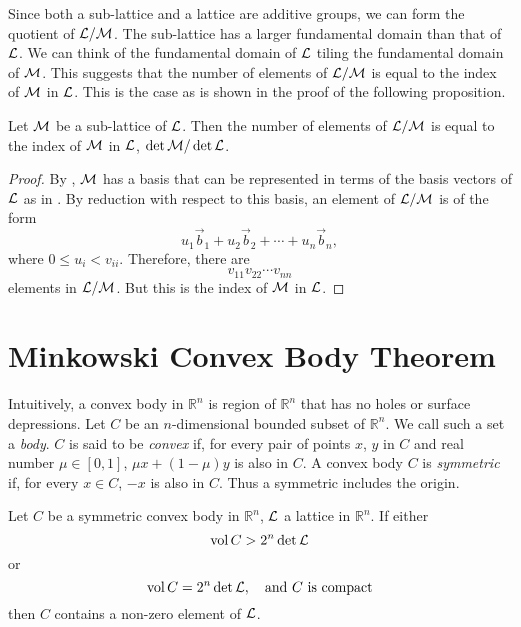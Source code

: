 Since both a sub-lattice and a lattice are additive groups, we can
form the quotient of ${\cal L}/{\cal M}$.  The sub-lattice has a
larger fundamental domain than that of ${\cal L}$.  We can think of
the fundamental domain of ${\cal L}$ tiling the fundamental domain of
${\cal M}$.    This suggests that the number of elements of ${\cal
L}/{\cal M}$ is equal to the index of ${\cal M}$ in ${\cal L}$.  This
is the case as is shown in the proof of the following proposition.

\begin{proposition} \label{SubLattice:Index:Prop}
Let ${\cal M}$ be a sub-lattice of ${\cal L}$.  Then the number of
elements of ${\cal L}/{\cal M}$ is equal to the index of ${\cal M}$ in
${\cal L}$, $\det {\cal M}/\det {\cal L}$.
\end{proposition}

\begin{proof}
By , ${\cal M}$ has a basis that can be
represented in terms of the basis vectors of ${\cal L}$ as in
.  By reduction with respect to this basis,
an element of ${\cal L}/{\cal M}$ is of the form
\[
u_1 \vec{b}_1 + u_2 \vec{b}_2 + \cdots + u_n \vec{b}_n,
\]
where $0 \le u_i < v_{ii}$.  Therefore, there are 
\[
v_{11} v_{22} \cdots v_{nn}
\]
elements in ${\cal L}/{\cal M}$.  But this is the index of ${\cal M}$
in ${\cal L}$.
\end{proof}

\section{Minkowski Convex Body Theorem}

Intuitively, a convex body in $\mathbb{R}^{n}$ is region of $\mathbb{R}^{n}$ that has
no holes or surface depressions.  Let $C$ be an $n$-dimensional
bounded subset of $\mathbb{R}^n$.  We call such a set a {\em body}.  $C$ is
said to be {\em convex} if, for every pair of
points $x$, $y$ in $C$ and real number $\mu \in [0, 1]$, $\mu x + (1 -
\mu) y$ is also in $C$.  A convex body $C$ is {\em
symmetric} if, for every $x \in C$, $-x$
is also in $C$.  Thus a symmetric  includes the origin.

\begin{proposition}[{\Minkowski}]
Let $C$ be a symmetric convex body in $\mathbb{R}^{n}$, ${\cal L}$ a lattice in
$\mathbb{R}^{n}$.  If either
\[
\mathop{\rm vol}\nolimits C > 2^n \det {\cal L}
\]
or 
\[
\mathop{\rm vol}\nolimits C = 2^n \det {\cal L}, \quad \mbox{and $C$ is compact}
\]
then $C$ contains a non-zero element of ${\cal L}$.
\label{Minkowski:Convex:Prop}
\end{proposition}

